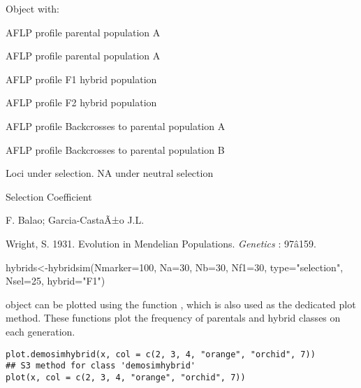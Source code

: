 \documentclass[letterpaper]{book}
\begin{document}
%
\begin{Value}
Object   with:
\begin{ldescription}
\item[\code{PA }] AFLP profile parental population A
\item[\code{PB }] AFLP profile parental population A
\item[\code{F1}] AFLP profile F1 hybrid population
\item[\code{F2}] AFLP profile F2 hybrid population
\item[\code{BxA}] AFLP profile Backcrosses to parental population A
\item[\code{BxB}] AFLP profile Backcrosses to parental population B
\item[\code{Nsel}] Loci under selection. NA under neutral selection
\item[\code{S}] Selection Coefficient
\end{ldescription}
\end{Value}
%
\begin{Author}\relax
F. Balao;
Garcia-CastaÃ±o J.L.
\end{Author}
%
\begin{References}\relax
Wright, S. 1931. Evolution in Mendelian Populations. \emph{Genetics} : 97â159. 
\end{References}
%
\begin{SeeAlso}\relax
{}
\end{SeeAlso}
%
\begin{Examples}
\begin{ExampleCode}
hybrids<-hybridsim(Nmarker=100, Na=30, Nb=30, Nf1=30, type="selection", Nsel=25, hybrid="F1")
\end{ExampleCode}
\end{Examples}
%
\begin{Description}\relax
{} object can be plotted using the function , which is also used as the dedicated plot method. These functions plot the frequency of parentals and hybrid classes on each generation.
\end{Description}
%
\begin{Usage}
\begin{verbatim}
plot.demosimhybrid(x, col = c(2, 3, 4, "orange", "orchid", 7))
## S3 method for class 'demosimhybrid'
plot(x, col = c(2, 3, 4, "orange", "orchid", 7))
\end{verbatim}
\end{Usage}
\end{document}
